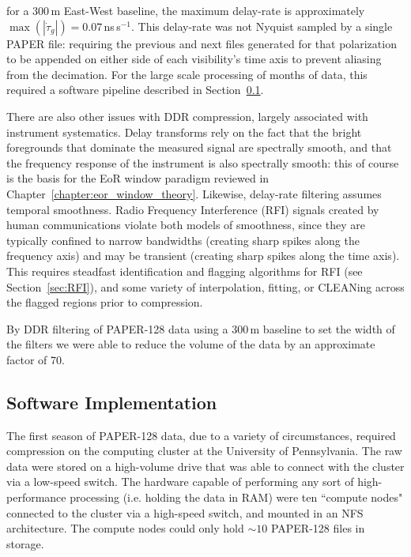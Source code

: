 for a 300\,m East-West baseline, the maximum delay-rate is approximately $\max(|\dot{\tau}_g|) = 0.07$\,ns\,s$^{-1}$. This delay-rate was not Nyquist sampled by a single PAPER file: requiring the previous and next files generated for that polarization to be appended on either side of each visibility's time axis to prevent aliasing from the decimation. For the large scale processing of months of data, this required a software pipeline described in Section~\ref{subsec:compression_software}.

There are also other issues with DDR compression, largely associated with instrument systematics. Delay transforms rely on the fact that the bright foregrounds that dominate the measured signal are spectrally smooth, and that the frequency response of the instrument is also spectrally smooth: this of course is the basis for the EoR window paradigm reviewed in Chapter~\ref{chapter:eor_window_theory}. Likewise, delay-rate filtering assumes temporal smoothness. Radio Frequency Interference (RFI) signals created by human communications violate both models of smoothness, since they are typically confined to narrow bandwidths (creating sharp spikes along the frequency axis) and may be transient (creating sharp spikes along the time axis). This requires steadfast identification and flagging algorithms for RFI (see Section~\ref{sec:RFI}), and some variety of interpolation, fitting, or CLEANing across the flagged regions prior to compression.

By DDR filtering of PAPER-128 data using a 300\,m baseline to set the width of the filters we were able to reduce the volume of the data by an approximate factor of 70.

\subsection{Software Implementation}
\label{subsec:compression_software}

The first season of PAPER-128 data, due to a variety of circumstances, required compression on the computing cluster at the University of Pennsylvania. The raw data were stored on a high-volume drive that was able to connect with the cluster via a low-speed switch. The hardware capable of performing any sort of high-performance processing (i.e. holding the data in RAM) were ten ``compute nodes" connected to the cluster via a high-speed switch, and mounted in an NFS architecture. The compute nodes could only hold $\sim 10$ PAPER-128 files in storage. 

